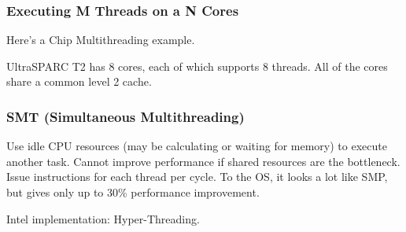 \documentclass[aspectratio=43]{beamer}
\newenvironment{changemargin}[1]{%
  \begin{list}{}{%
    \setlength{\topsep}{0pt}%
    \setlength{\leftmargin}{#1}%
    \setlength{\rightmargin}{1em}
    \setlength{\listparindent}{\parindent}%
    \setlength{\itemindent}{\parindent}%
    \setlength{\parsep}{\parskip}%
  }%
  \item[]}{\end{list}}
\begin{document}
\begin{frame}
  \frametitle{Executing M Threads on a N Cores}
\begin{center}
\end{center}

\begin{changemargin}{2.5cm}
Here's a Chip Multithreading example. \vfill

UltraSPARC T2 has 8 cores, each of which supports 8 
threads. All of the cores share a common level 2 cache.
\end{changemargin}

\end{frame}

\begin{frame}
  \frametitle{SMT (Simultaneous Multithreading)}

  \begin{changemargin}{2.5cm}
    Use idle CPU resources (may be calculating or waiting
          for memory) to execute another task.
    \vfill
    Cannot improve performance if shared resources are the bottleneck.
    \vfill
    Issue instructions for each thread per cycle.
    \vfill
    To the OS, it looks a lot like SMP, but gives only up to 30\% performance improvement.
    \vfill
    \item Intel implementation: Hyper-Threading.
  \end{changemargin}
\end{frame}
\end{document}
